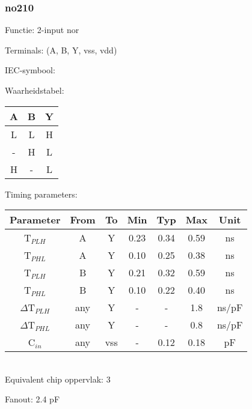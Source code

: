 \subsubsection{no210}

Functie: 2-input nor

Terminals: (A, B, Y, vss, vdd)


IEC-symbool:
\begin{figure}[bth]
\end{figure}

\begin{minipage}[t]{0.3\textwidth}
Waarheidstabel:\\

\begin{tabular}{|c|c||c|}
\hline
A	&B	&Y\\
\hline
L	&L	&H\\
-	&H	&L\\
H	&-	&L\\
\hline
\end{tabular}
\end{minipage}
\hfill
\begin{minipage}[t]{0.6\textwidth}
Timing parameters:\\

\begin{tabular}{|c|cc|ccc|c|}
\hline
Parameter		&From	&To	&Min	&Typ	&Max	&Unit\\
\hline
T$_{PLH}$               &A     	&Y      &0.23	&0.34	&0.59   &ns\\
T$_{PHL}$               &A    	&Y      &0.10	&0.25	&0.38   &ns\\
T$_{PLH}$               &B     	&Y      &0.21	&0.32	&0.59   &ns\\
T$_{PHL}$               &B    	&Y      &0.10	&0.22	&0.40   &ns\\
\hline
$\Delta$T$_{PLH}$       &any    &Y      &-	&-	&1.8   &ns/pF\\
$\Delta$T$_{PHL}$       &any    &Y      &-	&-	&0.8   &ns/pF\\
\hline
C$_{in}$                &any	&vss    &-	&0.12	&0.18   &pF\\
\hline
\end{tabular}
\end{minipage}
\\

Equivalent chip oppervlak: 3

Fanout: 2.4 pF


\clearpage
